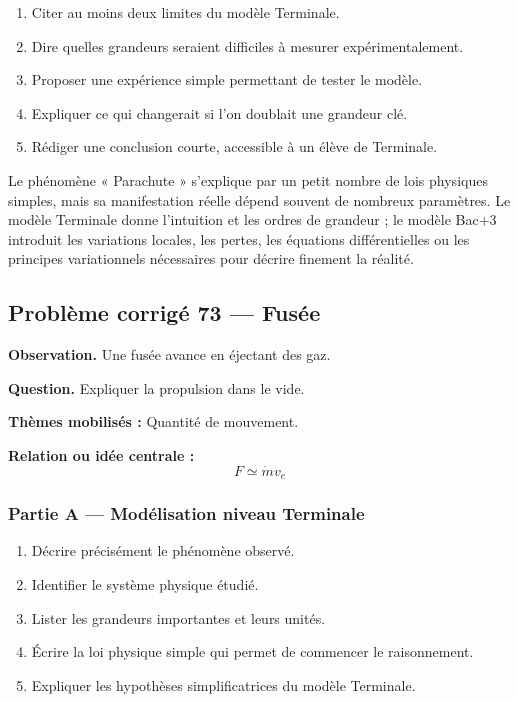 \documentclass[11pt,a4paper]{article}
\begin{document}
\begin{enumerate}
  \item Citer au moins deux limites du modèle Terminale.
  \item Dire quelles grandeurs seraient difficiles à mesurer expérimentalement.
  \item Proposer une expérience simple permettant de tester le modèle.
  \item Expliquer ce qui changerait si l'on doublait une grandeur clé.
  \item Rédiger une conclusion courte, accessible à un élève de Terminale.
\end{enumerate}

\begin{corrigebox}
Le phénomène « Parachute » s'explique par un petit nombre de lois physiques simples, mais sa manifestation réelle dépend souvent de nombreux paramètres. Le modèle Terminale donne l'intuition et les ordres de grandeur ; le modèle Bac+3 introduit les variations locales, les pertes, les équations différentielles ou les principes variationnels nécessaires pour décrire finement la réalité.
\end{corrigebox}

\subsection{Problème corrigé 73 — Fusée}

\begin{exercicebox}
\textbf{Observation.} Une fusée avance en éjectant des gaz.

\medskip
\textbf{Question.} Expliquer la propulsion dans le vide.

\medskip
\textbf{Thèmes mobilisés :} Quantité de mouvement.

\medskip
\textbf{Relation ou idée centrale :}
\[
F\simeq\dot m v_e
\]
\end{exercicebox}

\subsubsection*{Partie A — Modélisation niveau Terminale}

\begin{enumerate}
  \item Décrire précisément le phénomène observé.
  \item Identifier le système physique étudié.
  \item Lister les grandeurs importantes et leurs unités.
  \item Écrire la loi physique simple qui permet de commencer le raisonnement.
  \item Expliquer les hypothèses simplificatrices du modèle Terminale.
\end{enumerate}
\end{document}
